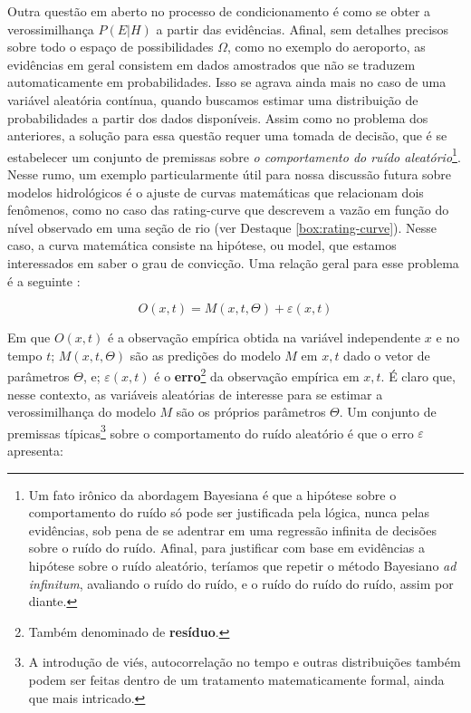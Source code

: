 \documentclass[./main.tex]{subfiles}
\begin{document}
\par Outra questão em aberto no processo de condicionamento é como se obter a verossimilhança $P(E | H)$ a partir das evidências. Afinal, sem detalhes precisos sobre todo o espaço de possibilidades $\Omega$, como no exemplo do aeroporto, as evidências em geral consistem em dados amostrados que não se traduzem automaticamente em probabilidades. Isso se agrava ainda mais no caso de uma variável aleatória contínua, quando buscamos estimar uma distribuição de probabilidades a partir dos dados disponíveis. Assim como no problema dos anteriores, a solução para essa questão requer uma tomada de decisão, que é se estabelecer um conjunto de premissas sobre \textit{o comportamento do ruído aleatório}\footnote{Um fato irônico da abordagem Bayesiana é que a hipótese sobre o comportamento do ruído só pode ser justificada pela lógica, nunca pelas evidências, sob pena de se adentrar em uma regressão infinita de decisões sobre o ruído do ruído. Afinal, para justificar com base em evidências a hipótese sobre o ruído aleatório, teríamos que repetir o método Bayesiano \textit{ad infinitum}, avaliando o ruído do ruído, e o ruído do ruído do ruído, assim por diante.}. Nesse rumo, um exemplo particularmente útil para nossa discussão futura sobre modelos hidrológicos é o ajuste de curvas matemáticas que relacionam dois fenômenos, como no caso das \gls{rating-curve} que descrevem a vazão em função do nível observado em uma seção de rio (ver Destaque \ref{box:rating-curve}).  Nesse caso, a curva matemática consiste na hipótese, ou \gls{model}, que estamos interessados em saber o grau de convicção.  Uma relação geral para esse problema é a seguinte \cite{Box1979}:
\begin{linenomath*}
\begin{equation}
\label{eq:bayes-model}
    O(x, t) = M(x, t, \Theta) + \varepsilon(x, t)
\end{equation}
\end{linenomath*}
Em que $O(x, t)$ é a observação empírica obtida na variável independente $x$ e no tempo $t$; $M(x, t, \Theta)$ são as predições do modelo $M$ em $x,t$ dado o vetor de parâmetros $\Theta$, e; $\varepsilon(x, t)$ é o \textbf{erro}\footnote{Também denominado de \textbf{resíduo}.} da observação empírica em $x,t$. É claro que, nesse contexto, as variáveis aleatórias de interesse para se estimar a verossimilhança do modelo $M$ são os próprios parâmetros $\Theta$. Um conjunto de premissas típicas\footnote{A introdução de viés, autocorrelação no tempo e outras distribuições também podem ser feitas dentro de um tratamento matematicamente formal, ainda que mais intricado.} sobre o comportamento do ruído aleatório é que o erro $\varepsilon$ apresenta:
\end{document}
